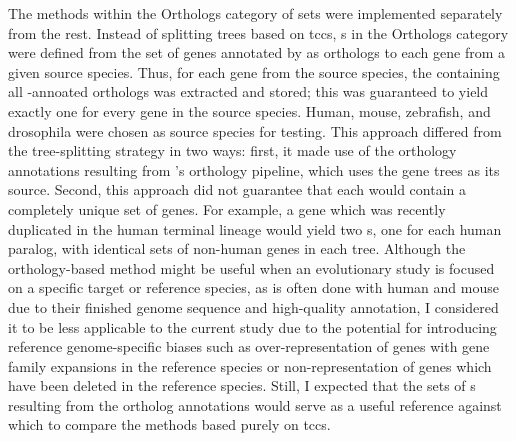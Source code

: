 The methods within the Orthologs category of \subtr{} sets were
implemented separately from the rest. Instead of splitting \cmp trees
based on \acp{tcc}, \subtr{}s in the Orthologs category were defined
from the set of genes annotated by \ens as orthologs to each gene from
a given source species. Thus, for each gene from the source species,
the \cmp \subtr containing all \ens{}-annoated orthologs was extracted
and stored; this was guaranteed to yield exactly one \subtr{} for
every gene in the source species. Human, mouse, zebrafish, and
drosophila were chosen as source species for testing. This approach
differed from the tree-splitting strategy in two ways: first, it made
use of the orthology annotations resulting from \ens{}'s orthology
pipeline, which uses the \cmp gene trees as its source. Second, this
approach did not guarantee that each \subtr{} would contain a
completely unique set of genes. For example, a gene which was recently
duplicated in the human terminal lineage would yield two \subtr{}s,
one for each human paralog, with identical sets of non-human genes in
each tree. Although the orthology-based method might be useful when an
evolutionary study is focused on a specific target or reference
species, as is often done with human and mouse due to their finished
genome sequence and high-quality annotation, I considered it to be
less applicable to the current study due to the potential for
introducing reference genome-specific biases such as
over-representation of genes with gene family expansions in the
reference species or non-representation of genes which have been
deleted in the reference species. Still, I expected that the sets of
\subtr{}s resulting from the \ens ortholog annotations would serve as
a useful reference against which to compare the methods based purely
on \acp{tcc}.


